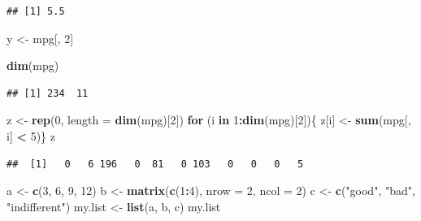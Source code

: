 \documentclass[]{article}
\newenvironment{Shaded}{\begin{snugshade}}{\end{snugshade}}
\newcommand{\KeywordTok}[1]{\textcolor[rgb]{0.13,0.29,0.53}{\textbf{#1}}}
\newcommand{\DataTypeTok}[1]{\textcolor[rgb]{0.13,0.29,0.53}{#1}}
\newcommand{\DecValTok}[1]{\textcolor[rgb]{0.00,0.00,0.81}{#1}}
\newcommand{\StringTok}[1]{\textcolor[rgb]{0.31,0.60,0.02}{#1}}
\newcommand{\ControlFlowTok}[1]{\textcolor[rgb]{0.13,0.29,0.53}{\textbf{#1}}}
\newcommand{\OperatorTok}[1]{\textcolor[rgb]{0.81,0.36,0.00}{\textbf{#1}}}
\newcommand{\NormalTok}[1]{#1}
\begin{document}
\begin{verbatim}
## [1] 5.5
\end{verbatim}

\begin{Shaded}
\begin{Highlighting}[]
\NormalTok{y <-}\StringTok{ }\NormalTok{mpg[, }\DecValTok{2}\NormalTok{]}
\end{Highlighting}
\end{Shaded}

\begin{Shaded}
\begin{Highlighting}[]
\KeywordTok{dim}\NormalTok{(mpg)}
\end{Highlighting}
\end{Shaded}

\begin{verbatim}
## [1] 234  11
\end{verbatim}

\begin{Shaded}
\begin{Highlighting}[]
\NormalTok{z <-}\StringTok{ }\KeywordTok{rep}\NormalTok{(}\DecValTok{0}\NormalTok{, }\DataTypeTok{length =} \KeywordTok{dim}\NormalTok{(mpg)[}\DecValTok{2}\NormalTok{])}
\ControlFlowTok{for}\NormalTok{ (i }\ControlFlowTok{in} \DecValTok{1}\OperatorTok{:}\KeywordTok{dim}\NormalTok{(mpg)[}\DecValTok{2}\NormalTok{])\{}
\NormalTok{    z[i] <-}\StringTok{ }\KeywordTok{sum}\NormalTok{(mpg[, i] }\OperatorTok{<}\StringTok{ }\DecValTok{5}\NormalTok{)\}}
\NormalTok{z}
\end{Highlighting}
\end{Shaded}

\begin{verbatim}
##  [1]   0   6 196   0  81   0 103   0   0   0   5
\end{verbatim}

\begin{Shaded}
\begin{Highlighting}[]
\NormalTok{a <-}\StringTok{ }\KeywordTok{c}\NormalTok{(}\DecValTok{3}\NormalTok{, }\DecValTok{6}\NormalTok{, }\DecValTok{9}\NormalTok{, }\DecValTok{12}\NormalTok{)}
\NormalTok{b <-}\StringTok{ }\KeywordTok{matrix}\NormalTok{(}\KeywordTok{c}\NormalTok{(}\DecValTok{1}\OperatorTok{:}\DecValTok{4}\NormalTok{), }\DataTypeTok{nrow =} \DecValTok{2}\NormalTok{, }\DataTypeTok{ncol =} \DecValTok{2}\NormalTok{)}
\NormalTok{c <-}\StringTok{ }\KeywordTok{c}\NormalTok{(}\StringTok{"good"}\NormalTok{, }\StringTok{"bad"}\NormalTok{, }\StringTok{"indifferent"}\NormalTok{)}
\NormalTok{my.list <-}\StringTok{ }\KeywordTok{list}\NormalTok{(a, b, c)}
\NormalTok{my.list}
\end{Highlighting}
\end{Shaded}
\end{document}
